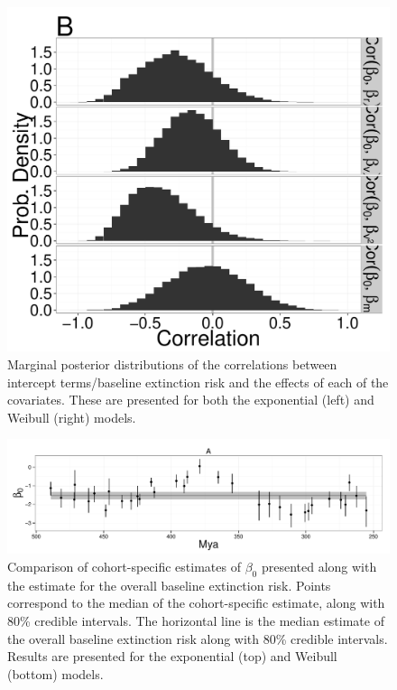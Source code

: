\documentclass[12pt,letterpaper]{article}
\begin{document}
\begin{figure}[ht]
  \centering
  \includegraphics[height = 0.5\textheight,width=\textwidth,keepaspectratio=true]{figure/correlation_marginal}
  \caption{Marginal posterior distributions of the correlations between intercept terms/baseline extinction risk and the effects of each of the covariates. These are presented for both the exponential (left) and Weibull (right) models.}
  \label{fig:corr}
\end{figure}

\begin{figure}[ht]
  \centering
  \includegraphics[height = 0.5\textheight,width=\textwidth,keepaspectratio=true]{figure/intercept_cohort}
  \caption{Comparison of cohort-specific estimates of \(\beta_{0}\) presented along with the estimate for the overall baseline extinction risk. Points correspond to the median of the cohort-specific estimate, along with 80\% credible intervals. The horizontal line is the median estimate of the overall baseline extinction risk along with 80\% credible intervals. Results are presented for the exponential (top) and Weibull (bottom) models.}
  \label{fig:cohort_intercept}
\end{figure}
\end{document}
